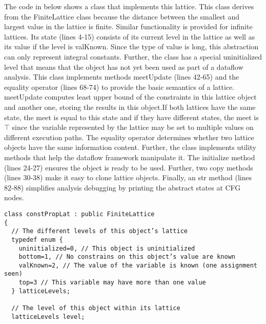 {The code in below shows a class that implements this lattice. This class derives from the {\scriptsize FiniteLattice} class because the distance between the smallest and largest value in the lattice is finite. Similar functionality is provided for infinite lattices. Its state (lines 4-15) consists of its current level in the lattice as well as its value if the level is {\scriptsize valKnown}. Since the type of {\scriptsize value} is {\scriptsize long}, this abstraction can only represent integral constants. Further, the class has a special {\scriptsize uninitialized} level that means that the object has not yet been used as part of a dataflow analysis. This class implements methods {\scriptsize meetUpdate} (lines 42-65) and the equality operator (lines 68-74) to provide the basic semantics of a lattice. {\scriptsize meetUpdate} computes least upper bound of the constraints in this lattice object and another one, storing the results in this object.If both lattices have the same state, the meet is equal to this state and if they have different states, the meet is $\top$ since the variable represented by the lattice may be set to multiple values on different execution paths. The equality operator determines whether two lattice objects have the same information content. Further, the class implements utility methods that help the dataflow framework manipulate it. The {\scriptsize initialize} method (lines 24-27) ensures the object is ready to be used. Further, two {\scriptsize copy} methods (lines 30-38) make it easy to clone lattice objects. Finally, an {\scriptsize str} method (lines 82-88) simplifies analysis debugging by printing the abstract states at CFG nodes.


%   

\begin{frame}
\centering
\begin{lstlisting}
class constPropLat : public FiniteLattice
{
  // The different levels of this object’s lattice
  typedef enum {
    uninitialized=0, // This object is uninitialized
    bottom=1, // No constrains on this object’s value are known
    valKnown=2, // The value of the variable is known (one assignment seen)
    top=3 // This variable may have more than one value
  } latticeLevels;
  
  // The level of this object within its lattice
  latticeLevels level;


\end{lstlisting}
\end{frame}}
